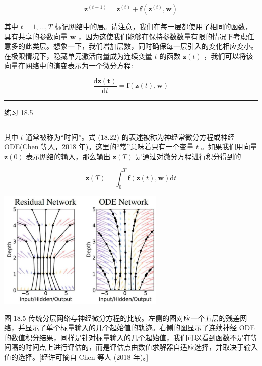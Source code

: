 \documentclass[10pt]{article}
\newcommand{\HRule}{\begin{center}\rule{0.9\linewidth}{0.2mm}\end{center}}
\begin{document}
\[
{\mathbf{z}}^{\left( t + 1\right) } = {\mathbf{z}}^{\left( t\right) } + \mathbf{f}\left( {{\mathbf{z}}^{\left( t\right) },\mathbf{w}}\right)  \tag{18.21}
\]

其中 \(t = 1,\ldots ,T\) 标记网络中的层。请注意，我们在每一层都使用了相同的函数，具有共享的参数向量 \(\mathbf{w}\) ，因为这使我们能够在保持参数数量有限的情况下考虑任意多的此类层。想象一下，我们增加层数，同时确保每一层引入的变化相应变小。在极限情况下，隐藏单元激活向量成为连续变量 \(t\) 的函数 \(\mathbf{z}\left( t\right)\) ，我们可以将该向量在网络中的演变表示为一个微分方程:

\[
\frac{\mathrm{d}\mathbf{z}\left( \mathbf{t}\right) }{\mathrm{d}t} = \mathbf{f}\left( {\mathbf{z}\left( t\right) ,\mathbf{w}}\right)  \tag{18.22}
\]

\HRule

练习 18.5

\HRule

其中 \(t\) 通常被称为“时间”。式 (18.22) 的表述被称为神经常微分方程或神经 ODE(Chen 等人，2018 年)。这里的“常”意味着只有一个变量 \(t\) 。如果我们用向量 \(\mathbf{z}\left( 0\right)\) 表示网络的输入，那么输出 \(\mathbf{z}\left( T\right)\) 是通过对微分方程进行积分得到的

\[
\mathbf{z}\left( T\right)  = {\int }_{0}^{T}\mathbf{f}\left( {\mathbf{z}\left( t\right) ,\mathbf{w}}\right) \mathrm{d}t \tag{18.23}
\]

\begin{center}
\includegraphics[max width=0.6\textwidth]{images/0194e279-9b28-703a-88f4-c3ac21e2010d_574_580_358_775_552_0.jpg}
\end{center}
\hspace*{3em} 

图 18.5 传统分层网络与神经微分方程的比较。左侧的图对应一个五层的残差网络，并显示了单个标量输入的几个起始值的轨迹。右侧的图显示了连续神经 ODE 的数值积分结果，同样是针对标量输入的几个起始值，我们可以看到函数不是在等间隔的时间点上进行评估的，而是评估点由数值求解器自适应选择，并取决于输入值的选择。[经许可摘自 Chen 等人 (2018 年)。]
\end{document}
